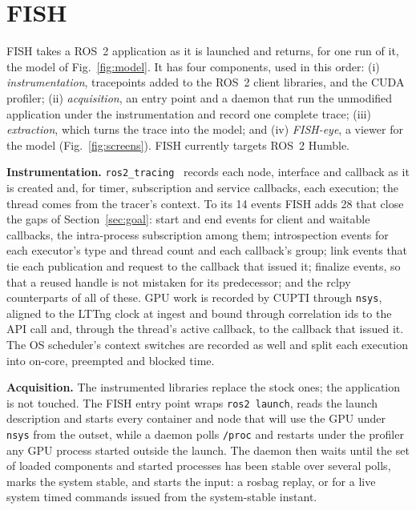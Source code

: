 \section{FISH}
\label{sec:method}
FISH takes a ROS~2 application as it is launched and returns, for one run of it, the model of Fig.~\ref{fig:model}. It has four components, used in this order: (i) \emph{instrumentation}, tracepoints added to the ROS~2 client libraries, and the CUDA profiler; (ii) \emph{acquisition}, an entry point and a daemon that run the unmodified application under the instrumentation and record one complete trace; (iii) \emph{extraction}, which turns the trace into the model; and (iv) \emph{FISH-eye}, a viewer for the model (Fig.~\ref{fig:screens}). FISH currently targets ROS~2 Humble.

\noindent\textbf{Instrumentation.} \texttt{ros2\_tracing}~\cite{bedard-2022-ros2tracing} records each node, interface and callback as it is created and, for timer, subscription and service callbacks, each execution; the thread comes from the tracer's context. To its 14 events FISH adds 28 that close the gaps of Section~\ref{sec:goal}: start and end events for client and waitable callbacks, the intra-process subscription among them; introspection events for each executor's type and thread count and each callback's group; link events that tie each publication and request to the callback that issued it; finalize events, so that a reused handle is not mistaken for its predecessor; and the rclpy counterparts of all of these. GPU work is recorded by CUPTI through \texttt{nsys}, aligned to the LTTng clock at ingest and bound through correlation ids to the API call and, through the thread's active callback, to the callback that issued it. The OS scheduler's context switches are recorded as well and split each execution into on-core, preempted and blocked time.

\noindent\textbf{Acquisition.} The instrumented libraries replace the stock ones; the application is not touched. The FISH entry point wraps \texttt{ros2 launch}, reads the launch description and starts every container and node that will use the GPU under \texttt{nsys} from the outset, while a daemon polls \texttt{/proc} and restarts under the profiler any GPU process started outside the launch. The daemon then waits until the set of loaded components and started processes has been stable over several polls, marks the system stable, and starts the input: a rosbag replay, or for a live system timed commands issued from the system-stable instant.


